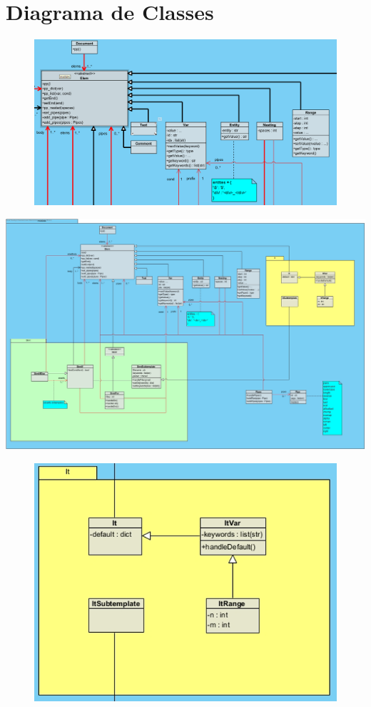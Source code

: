 \documentclass[11pt]{report}
\begin{document}
\section{Diagrama de Classes} \label{sec:classes}
\begin{figure}[!ht]
    \centering
    \includegraphics[width=\linewidth]{assets/dir_modules.png}
\end{figure}
\begin{landscape}
    \centering
    \includegraphics[width=\linewidth]{assets/class_diagram.jpg}
\end{landscape}
\begin{figure}[!ht]
    \centering
    \includegraphics[width=\linewidth]{assets/dir_it.png}
\end{figure}
\end{document}
